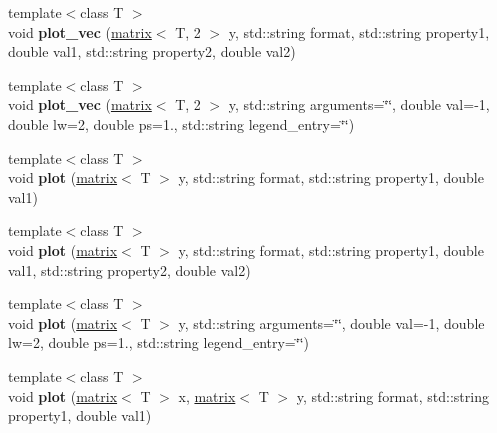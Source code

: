 \begin{DoxyCompactItemize}
\item 
\hypertarget{classkeycpp_1_1_figure_a6f11cbe9b6afa25963828b566c20b7a1}{{\footnotesize template$<$class T $>$ }\\void {\bfseries plot\-\_\-vec} (\hyperlink{classkeycpp_1_1matrix}{matrix}$<$ T, 2 $>$ y, std\-::string format, std\-::string property1, double val1, std\-::string property2, double val2)}\label{classkeycpp_1_1_figure_a6f11cbe9b6afa25963828b566c20b7a1}

\item 
\hypertarget{classkeycpp_1_1_figure_a4ca75c7911132c98c806c2e2abeb4a43}{{\footnotesize template$<$class T $>$ }\\void {\bfseries plot\-\_\-vec} (\hyperlink{classkeycpp_1_1matrix}{matrix}$<$ T, 2 $>$ y, std\-::string arguments=\char`\"{}\char`\"{}, double val=-\/1, double lw=2, double ps=1., std\-::string legend\-\_\-entry=\char`\"{}\char`\"{})}\label{classkeycpp_1_1_figure_a4ca75c7911132c98c806c2e2abeb4a43}

\item 
\hypertarget{classkeycpp_1_1_figure_a88e55b3a2c1b05c7c7fe2e6785e11f58}{{\footnotesize template$<$class T $>$ }\\void {\bfseries plot} (\hyperlink{classkeycpp_1_1matrix}{matrix}$<$ T $>$ y, std\-::string format, std\-::string property1, double val1)}\label{classkeycpp_1_1_figure_a88e55b3a2c1b05c7c7fe2e6785e11f58}

\item 
\hypertarget{classkeycpp_1_1_figure_a2e6daf7811c3d34fabb83bc8368e1e7c}{{\footnotesize template$<$class T $>$ }\\void {\bfseries plot} (\hyperlink{classkeycpp_1_1matrix}{matrix}$<$ T $>$ y, std\-::string format, std\-::string property1, double val1, std\-::string property2, double val2)}\label{classkeycpp_1_1_figure_a2e6daf7811c3d34fabb83bc8368e1e7c}

\item 
\hypertarget{classkeycpp_1_1_figure_a39dd5e2d5e6acb6db99ac75476ea777a}{{\footnotesize template$<$class T $>$ }\\void {\bfseries plot} (\hyperlink{classkeycpp_1_1matrix}{matrix}$<$ T $>$ y, std\-::string arguments=\char`\"{}\char`\"{}, double val=-\/1, double lw=2, double ps=1., std\-::string legend\-\_\-entry=\char`\"{}\char`\"{})}\label{classkeycpp_1_1_figure_a39dd5e2d5e6acb6db99ac75476ea777a}

\item 
\hypertarget{classkeycpp_1_1_figure_a35987b305f55c3b8c612fbaec2223060}{{\footnotesize template$<$class T $>$ }\\void {\bfseries plot} (\hyperlink{classkeycpp_1_1matrix}{matrix}$<$ T $>$ x, \hyperlink{classkeycpp_1_1matrix}{matrix}$<$ T $>$ y, std\-::string format, std\-::string property1, double val1)}\label{classkeycpp_1_1_figure_a35987b305f55c3b8c612fbaec2223060}


\end{DoxyCompactItemize}
